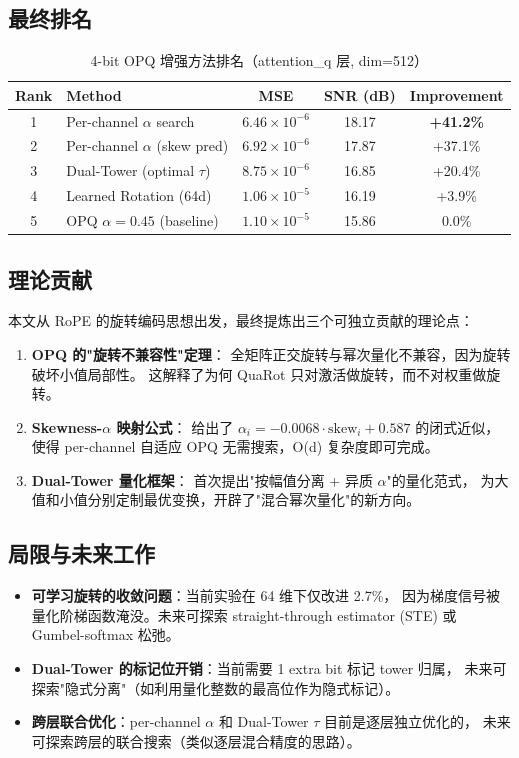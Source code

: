 \subsection{最终排名}

\begin{table}[h]
\centering
\caption{4-bit OPQ 增强方法排名（attention\_q 层, dim=512）}
\label{tab:roq_v2_ranking}
\begin{tabular}{c|l|c|c|c}
\hline
Rank & Method & MSE & SNR (dB) & Improvement \\
\hline
1 & Per-channel $\alpha$ search & $6.46 \times 10^{-6}$ & 18.17 & \textbf{+41.2\%} \\
2 & Per-channel $\alpha$ (skew pred) & $6.92 \times 10^{-6}$ & 17.87 & +37.1\% \\
3 & Dual-Tower (optimal $\tau$) & $8.75 \times 10^{-6}$ & 16.85 & +20.4\% \\
4 & Learned Rotation (64d) & $1.06 \times 10^{-5}$ & 16.19 & +3.9\% \\
5 & OPQ $\alpha=0.45$ (baseline) & $1.10 \times 10^{-5}$ & 15.86 & 0.0\% \\
\hline
\end{tabular}
\end{table}

\subsection{理论贡献}

本文从 RoPE 的旋转编码思想出发，最终提炼出三个可独立贡献的理论点：

\begin{enumerate}
\item \textbf{OPQ 的"旋转不兼容性"定理}：
  全矩阵正交旋转与幂次量化不兼容，因为旋转破坏小值局部性。
  这解释了为何 QuaRot 只对激活做旋转，而不对权重做旋转。

\item \textbf{Skewness-$\alpha$ 映射公式}：
  给出了 $\alpha_i = -0.0068 \cdot \text{skew}_i + 0.587$ 的闭式近似，
  使得 per-channel 自适应 OPQ 无需搜索，O(d) 复杂度即可完成。

\item \textbf{Dual-Tower 量化框架}：
  首次提出"按幅值分离 + 异质 $\alpha$"的量化范式，
  为大值和小值分别定制最优变换，开辟了"混合幂次量化"的新方向。
\end{enumerate}

\subsection{局限与未来工作}

\begin{itemize}
\item \textbf{可学习旋转的收敛问题}：当前实验在 64 维下仅改进 2.7\%，
  因为梯度信号被量化阶梯函数淹没。未来可探索 straight-through estimator (STE) 或 Gumbel-softmax 松弛。
\item \textbf{Dual-Tower 的标记位开销}：当前需要 1 extra bit 标记 tower 归属，
  未来可探索"隐式分离"（如利用量化整数的最高位作为隐式标记）。
\item \textbf{跨层联合优化}：per-channel $\alpha$ 和 Dual-Tower $\tau$ 目前是逐层独立优化的，
  未来可探索跨层的联合搜索（类似逐层混合精度的思路）。
\end{itemize}
